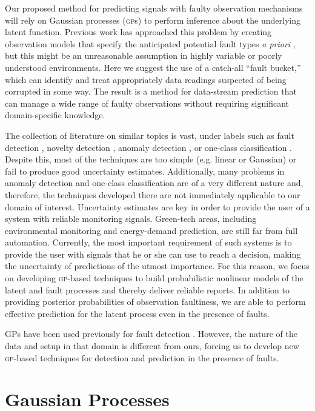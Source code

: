 \documentclass{article}
\newcommand{\acro}[1]{\textsc{#1}}
\begin{document}
Our proposed method for predicting signals with faulty observation
mechanisms will rely on Gaussian processes (\acro{gp}s) to perform
inference about the underlying latent function.  Previous work has
approached this problem by creating observation models that specify
the anticipated potential fault types \textit{a priori}
\citep{garnettosborne}, but this might be an unreasonable assumption
in highly variable or poorly understood environments.  Here we suggest
the use of a catch-all ``fault bucket,'' which can identify and treat
appropriately data readings suspected of being corrupted in some way.
The result is a method for data-stream prediction that can manage a
wide range of faulty observations without requiring significant
domain-specific knowledge.

The collection of literature on similar topics is vast, under labels
such as fault detection \citep{deFreitas1996, Eciolaza2001,
  Isermann2005, Ding2008}, novelty detection \citep{Markou2003},
anomaly detection \citep{Chandola:2009}, or one-class classification
\citep{Khan2010}. Despite this, most of the techniques are too simple
(e.g. linear or Gaussian) or fail to produce good uncertainty
estimates. Additionally, many problems in anomaly detection and
one-class classification are of a very different nature and,
therefore, the techniques developed there are not immediately
applicable to our domain of interest. Uncertainty estimates are key in
order to provide the user of a system with reliable monitoring
signals. Green-tech areas, including environmental monitoring and
energy-demand prediction, are still far from full
automation. Currently, the most important requirement of such systems
is to provide the user with signals that he or she can use to reach a
decision, making the uncertainty of predictions of the utmost
importance. For this reason, we focus on developing \acro{gp}-based
techniques to build probabilistic nonlinear models of the latent and
fault processes and thereby deliver reliable reports.  In addition to
providing posterior probabilities of observation faultiness, we are
able to perform effective prediction for the latent process even in
the presence of faults.

GPs have been used previously for fault detection
\citep{Eciolaza2001}. However, the nature of the data and setup in
that domain is different from ours, forcing us to develop new
\acro{gp}-based techniques for detection and prediction in the
presence of faults.

\section{Gaussian Processes}
\end{document}
